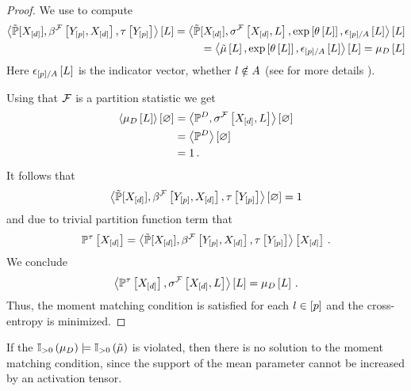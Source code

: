 \begin{proof}
    We use  to compute
    \begin{align*}
        \left\langle \tilde{\mathbb{P}}[X_{[d]}],\beta^{\mathcal{F}}\left[Y_{[p]},X_{[d]}\right],\tau\left[Y_{[p]}\right]\right\rangle \left[ L \right]
        = \left\langle \tilde{\mathbb{P}}[X_{[d]}],\sigma^{\mathcal{F}}\left[X_{[d]},L\right],\mathrm{exp}\left[\theta\left[L\right]\right],\epsilon_{[p]/A}\left[L\right]\right\rangle \left[ L \right] \\
        = \left\langle \tilde{\mu}\left[L\right],\mathrm{exp}\left[\theta\left[L\right]\right],\epsilon_{[p]/A}\left[L\right]\right\rangle \left[ L \right]
        = \mu_{D}\left[L\right]
    \end{align*}
    Here $\epsilon_{[p]/A}\left[L\right]$ is the indicator vector, whether $l\notin A$ (see for more details ).

    Using that $\mathcal{F}$ is a partition statistic we get
    \begin{align*}
        \left\langle \mu_{D}\left[L\right]\right\rangle \left[ \varnothing \right]
        &= \left\langle \mathbb{P}^{D},\sigma^{\mathcal{F}}\left[X_{[d]},L\right]\right\rangle \left[ \varnothing \right] \\
        &= \left\langle \mathbb{P}^{D}\right\rangle \left[ \varnothing \right] \\
        &= 1 \, .
    \end{align*}
    It follows that
    \begin{align*}
        \left\langle \tilde{\mathbb{P}}[X_{[d]}],\beta^{\mathcal{F}}\left[Y_{[p]},X_{[d]}\right],\tau\left[Y_{[p]}\right]\right\rangle \left[ \varnothing \right] = 1
    \end{align*}
    and due to trivial partition function term that
    \begin{align*}
        \mathbb{P}^{\tau}\left[X_{[d]}\right] = \left\langle \tilde{\mathbb{P}}[X_{[d]}],\beta^{\mathcal{F}}\left[Y_{[p]},X_{[d]}\right],\tau\left[Y_{[p]}\right]\right\rangle \left[ X_{[d]} \right] \, .
    \end{align*}
    We conclude
    \begin{align*}
        \left\langle \mathbb{P}^{\tau}\left[X_{[d]}\right],\sigma^{\mathcal{F}}\left[X_{[d]},L\right]\right\rangle \left[ L \right]
        = \mu_{D}\left[L\right] \, .
    \end{align*}
    Thus, the moment matching condition is satisfied for each $l\in[p]$ and the cross-entropy is minimized.
\end{proof}

If the $\mathbb{I}_{>0}\left(\mu_{D}\right)\models\mathbb{I}_{>0}\left(\tilde{\mu}\right)$ is violated, then there is no solution to the moment matching condition, since the support of the mean parameter cannot be increased by an activation tensor.

